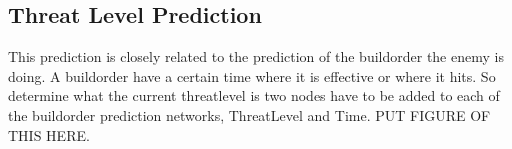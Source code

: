 \subsection{Threat Level Prediction}
	This prediction is closely related to the prediction of the buildorder the enemy is doing. A buildorder have a certain time where it is effective 
	or where it hits. So determine what the current threatlevel is two nodes have to be added to each of the buildorder prediction networks, ThreatLevel 
	and Time. PUT FIGURE OF THIS HERE.















 